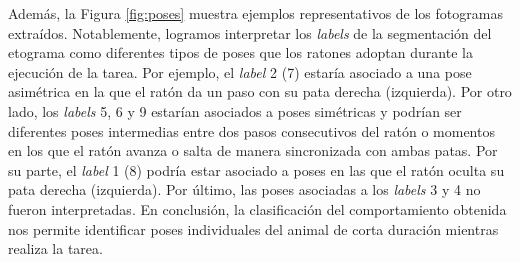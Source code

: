 Además, la Figura \ref{fig:poses} muestra ejemplos representativos de los fotogramas extraídos. Notablemente, logramos interpretar los \textit{labels} de la segmentación del etograma como diferentes tipos de poses que los ratones adoptan durante la ejecución de la tarea. Por ejemplo, el \textit{label} 2 (7) estaría asociado a una pose asimétrica en la que el ratón da un paso con su pata derecha (izquierda). Por otro lado, los \textit{labels} 5, 6 y 9 estarían asociados a poses simétricas y podrían ser diferentes poses intermedias entre dos pasos consecutivos del ratón o momentos en los que el ratón avanza o salta de manera sincronizada con ambas patas. Por su parte, el \textit{label} 1 (8) podría estar asociado a poses en las que el ratón oculta su pata derecha (izquierda). Por último, las poses asociadas a los \textit{labels} 3 y 4 no fueron interpretadas. En conclusión, la clasificación del comportamiento obtenida nos permite identificar poses individuales del animal de corta duración mientras realiza la tarea.

